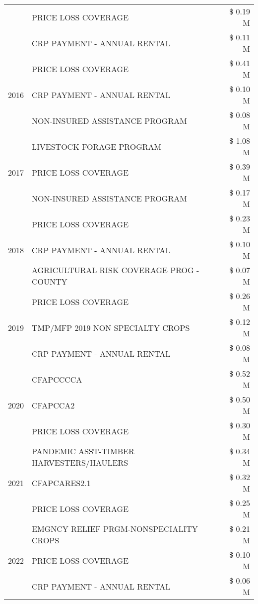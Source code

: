 \begin{tabular}{llr}
 & PRICE LOSS COVERAGE & \$ 0.19 M \\
 & CRP PAYMENT - ANNUAL RENTAL & \$ 0.11 M \\
\cline{1-3}
\multirow[t]{3}{*}{2016} & PRICE LOSS COVERAGE & \$ 0.41 M \\
 & CRP PAYMENT - ANNUAL RENTAL & \$ 0.10 M \\
 & NON-INSURED ASSISTANCE PROGRAM & \$ 0.08 M \\
\cline{1-3}
\multirow[t]{3}{*}{2017} & LIVESTOCK FORAGE PROGRAM & \$ 1.08 M \\
 & PRICE LOSS COVERAGE & \$ 0.39 M \\
 & NON-INSURED ASSISTANCE PROGRAM & \$ 0.17 M \\
\cline{1-3}
\multirow[t]{3}{*}{2018} & PRICE LOSS COVERAGE & \$ 0.23 M \\
 & CRP PAYMENT - ANNUAL RENTAL & \$ 0.10 M \\
 & AGRICULTURAL RISK COVERAGE PROG - COUNTY & \$ 0.07 M \\
\cline{1-3}
\multirow[t]{3}{*}{2019} & PRICE LOSS COVERAGE & \$ 0.26 M \\
 & TMP/MFP 2019 NON SPECIALTY CROPS & \$ 0.12 M \\
 & CRP PAYMENT - ANNUAL RENTAL & \$ 0.08 M \\
\cline{1-3}
\multirow[t]{3}{*}{2020} & CFAPCCCCA & \$ 0.52 M \\
 & CFAPCCA2 & \$ 0.50 M \\
 & PRICE LOSS COVERAGE & \$ 0.30 M \\
\cline{1-3}
\multirow[t]{3}{*}{2021} & PANDEMIC ASST-TIMBER HARVESTERS/HAULERS & \$ 0.34 M \\
 & CFAPCARES2.1 & \$ 0.32 M \\
 & PRICE LOSS COVERAGE & \$ 0.25 M \\
\cline{1-3}
\multirow[t]{3}{*}{2022} & EMGNCY RELIEF PRGM-NONSPECIALITY CROPS & \$ 0.21 M \\
 & PRICE LOSS COVERAGE & \$ 0.10 M \\
 & CRP PAYMENT - ANNUAL RENTAL & \$ 0.06 M \\
\cline{1-3}
\bottomrule
\end{tabular}
